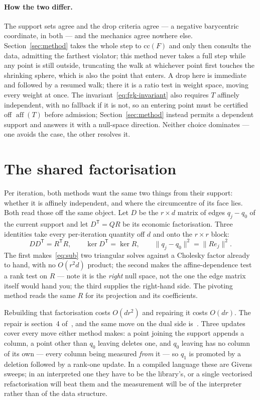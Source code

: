 \documentclass[10pt,a4paper]{article}
\theoremstyle{plain}
\DeclareMathOperator{\aff}{aff}
\newcommand{\norm}[1]{\lVert #1 \rVert}
\newcommand{\T}{^{\mathsf{T}}}
\begin{document}
\paragraph{How the two differ.} The support sets agree and the drop criteria agree
--- a negative barycentric coordinate, in both --- and the mechanics agree nowhere
else. Section~\ref{sec:method} takes the whole step to $\mathrm{cc}(F)$ and only
then consults the data, admitting the farthest violator; this method never takes a
full step while any point is still outside, truncating the walk at whichever point
first touches the shrinking sphere, which is also the point that enters. A drop
here is immediate and followed by a resumed walk; there it is a ratio test in
weight space, moving every weight at once. The invariant~\eqref{eq:fgk-invariant}
also requires $T$ affinely independent, with no fallback if it is not, so an
entering point must be certified off $\aff(T)$ before admission;
Section~\ref{sec:method} instead permits a dependent support and answers it with a
null-space direction. Neither choice dominates --- one avoids the case, the other
resolves it.

\section{The shared factorisation}
\label{sec:qr}

Per iteration, both methods want the same two things from their support: whether
it is affinely independent, and where the circumcentre of its face lies. Both read
those off the same object. Let $D$ be the $r\times d$ matrix of edges $q_j-q_0$ of
the current support and let $D\T=QR$ be its economic factorisation. Three
identities take every per-iteration quantity off $d$ and onto the $r\times r$
block:
\begin{equation}
  \label{eq:qr-identities}
  DD\T=R\T R,\qquad \ker D\T=\ker R,\qquad \norm{q_j-q_0}^2=\norm{R e_j}^2 .
\end{equation}
The first makes~\eqref{eq:sub} two triangular solves against a Cholesky factor
already to hand, with no $O(r^2d)$ product; the second makes the
affine-dependence test a rank test on $R$ --- note it is the \emph{right} null
space, not the one the edge matrix itself would hand you; the third supplies the
right-hand side. The pivoting method reads the same $R$ for its projection and its
coefficients.

Rebuilding that factorisation costs $O(dr^2)$ and repairing it costs $O(dr)$. The
repair is section~4 of~\cite{fischer2003}, and the same move on the dual side
is~\cite{cavaleiro2018}. Three updates cover every move either method makes: a
point joining the support appends a column, a point other than $q_0$ leaving
deletes one, and $q_0$ leaving has no column of its own --- every column being
measured \emph{from} it --- so $q_1$ is promoted by a deletion followed by a
rank-one update. In a compiled language these are Givens sweeps; in an interpreted
one they have to be the library's, or a single vectorised refactorisation will beat
them and the measurement will be of the interpreter rather than of the data
structure.
\end{document}
